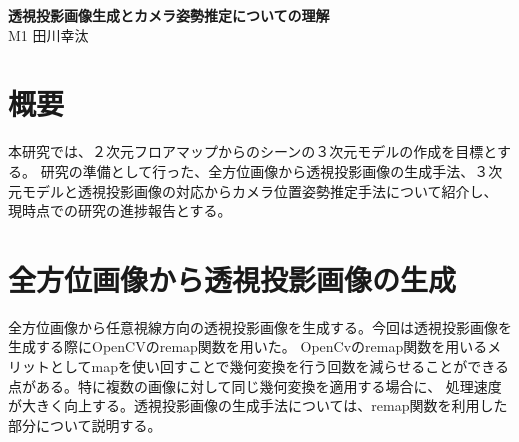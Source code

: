 \documentclass[]{jarticle}          %
\begin{document}

\vspace*{2ex}
\begin{center}
 {\Large \bf 透視投影画像生成とカメラ姿勢推定についての理解}\\ %
 \vspace*{5mm}
 {\large M1 田川幸汰}%
\end{center}






\section{概要}
本研究では、２次元フロアマップからのシーンの３次元モデルの作成を目標とする。
研究の準備として行った、全方位画像から透視投影画像の生成手法、３次元モデルと透視投影画像の対応からカメラ位置姿勢推定手法について紹介し、
現時点での研究の進捗報告とする。

\section{全方位画像から透視投影画像の生成}
全方位画像から任意視線方向の透視投影画像を生成する。今回は透視投影画像を生成する際にOpenCVのremap関数を用いた。
OpenCvのremap関数を用いるメリットとしてmapを使い回すことで幾何変換を行う回数を減らせることができる点がある。特に複数の画像に対して同じ幾何変換を適用する場合に、
処理速度が大きく向上する。透視投影画像の生成手法については、remap関数を利用した部分について説明する。
\end{document}
